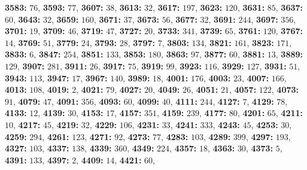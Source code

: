 \textsf{\bfseries 3583:} $76$, \textsf{\bfseries 3593:} $77$, \textsf{\bfseries 3607:} $38$, \textsf{\bfseries 3613:} $32$, \textsf{\bfseries 3617:} $197$, \textsf{\bfseries 3623:} $120$, \textsf{\bfseries 3631:} $85$, \textsf{\bfseries 3637:} $60$, \textsf{\bfseries 3643:} $32$, \textsf{\bfseries 3659:} $160$, \textsf{\bfseries 3671:} $37$, \textsf{\bfseries 3673:} $56$, \textsf{\bfseries 3677:} $32$, \textsf{\bfseries 3691:} $244$, \textsf{\bfseries 3697:} $356$, \textsf{\bfseries 3701:} $19$, \textsf{\bfseries 3709:} $46$, \textsf{\bfseries 3719:} $47$, \textsf{\bfseries 3727:} $20$, \textsf{\bfseries 3733:} $341$, \textsf{\bfseries 3739:} $65$, \textsf{\bfseries 3761:} $120$, \textsf{\bfseries 3767:} $14$, \textsf{\bfseries 3769:} $51$, \textsf{\bfseries 3779:} $24$, \textsf{\bfseries 3793:} $28$, \textsf{\bfseries 3797:} $7$, \textsf{\bfseries 3803:} $134$, \textsf{\bfseries 3821:} $161$, \textsf{\bfseries 3823:} $171$, \textsf{\bfseries 3833:} $6$, \textsf{\bfseries 3847:} $254$, \textsf{\bfseries 3851:} $133$, \textsf{\bfseries 3853:} $180$, \textsf{\bfseries 3863:} $97$, \textsf{\bfseries 3877:} $60$, \textsf{\bfseries 3881:} $13$, \textsf{\bfseries 3889:} $129$, \textsf{\bfseries 3907:} $281$, \textsf{\bfseries 3911:} $26$, \textsf{\bfseries 3917:} $75$, \textsf{\bfseries 3919:} $99$, \textsf{\bfseries 3923:} $116$, \textsf{\bfseries 3929:} $127$, \textsf{\bfseries 3931:} $51$, \textsf{\bfseries 3943:} $113$, \textsf{\bfseries 3947:} $17$, \textsf{\bfseries 3967:} $140$, \textsf{\bfseries 3989:} $18$, \textsf{\bfseries 4001:} $176$, \textsf{\bfseries 4003:} $23$, \textsf{\bfseries 4007:} $166$, \textsf{\bfseries 4013:} $108$, \textsf{\bfseries 4019:} $2$, \textsf{\bfseries 4021:} $79$, \textsf{\bfseries 4027:} $20$, \textsf{\bfseries 4049:} $26$, \textsf{\bfseries 4051:} $21$, \textsf{\bfseries 4057:} $122$, \textsf{\bfseries 4073:} $91$, \textsf{\bfseries 4079:} $47$, \textsf{\bfseries 4091:} $356$, \textsf{\bfseries 4093:} $60$, \textsf{\bfseries 4099:} $40$, \textsf{\bfseries 4111:} $244$, \textsf{\bfseries 4127:} $7$, \textsf{\bfseries 4129:} $78$, \textsf{\bfseries 4133:} $12$, \textsf{\bfseries 4139:} $30$, \textsf{\bfseries 4153:} $17$, \textsf{\bfseries 4157:} $351$, \textsf{\bfseries 4159:} $239$, \textsf{\bfseries 4177:} $80$, \textsf{\bfseries 4201:} $65$, \textsf{\bfseries 4211:} $10$, \textsf{\bfseries 4217:} $45$, \textsf{\bfseries 4219:} $32$, \textsf{\bfseries 4229:} $106$, \textsf{\bfseries 4231:} $33$, \textsf{\bfseries 4241:} $333$, \textsf{\bfseries 4243:} $45$, \textsf{\bfseries 4253:} $30$, \textsf{\bfseries 4259:} $294$, \textsf{\bfseries 4261:} $123$, \textsf{\bfseries 4271:} $92$, \textsf{\bfseries 4273:} $77$, \textsf{\bfseries 4283:} $103$, \textsf{\bfseries 4289:} $399$, \textsf{\bfseries 4297:} $193$, \textsf{\bfseries 4327:} $103$, \textsf{\bfseries 4337:} $138$, \textsf{\bfseries 4339:} $360$, \textsf{\bfseries 4349:} $224$, \textsf{\bfseries 4357:} $18$, \textsf{\bfseries 4363:} $30$, \textsf{\bfseries 4373:} $5$, \textsf{\bfseries 4391:} $133$, \textsf{\bfseries 4397:} $2$, \textsf{\bfseries 4409:} $14$, \textsf{\bfseries 4421:} $60$, 
